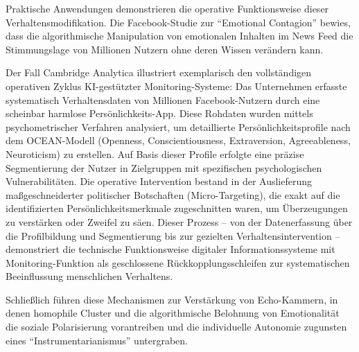 Praktische Anwendungen demonstrieren die operative Funktionsweise dieser Verhaltensmodifikation. Die Facebook-Studie zur \enquote{Emotional Contagion} bewies, dass die algorithmische Manipulation von emotionalen Inhalten im News Feed die Stimmungslage von Millionen Nutzern ohne deren Wissen verändern kann.

Der Fall Cambridge Analytica illustriert exemplarisch den vollständigen operativen Zyklus \ac{KI}-gestützter Monitoring-Systeme: Das Unternehmen erfasste systematisch Verhaltensdaten von Millionen Facebook-Nutzern durch eine scheinbar harmlose Persönlichkeits-App. Diese Rohdaten wurden mittels psychometrischer Verfahren analysiert, um detaillierte Persönlichkeitsprofile nach dem OCEAN-Modell (Openness, Conscientiousness, Extraversion, Agreeableness, Neuroticism) zu erstellen. Auf Basis dieser Profile erfolgte eine präzise Segmentierung der Nutzer in Zielgruppen mit spezifischen psychologischen Vulnerabilitäten. Die operative Intervention bestand in der Auslieferung maßgeschneiderter politischer Botschaften (Micro-Targeting), die exakt auf die identifizierten Persönlichkeitsmerkmale zugeschnitten waren, um Überzeugungen zu verstärken oder Zweifel zu säen. Dieser Prozess -- von der Datenerfassung über die Profilbildung und Segmentierung bis zur gezielten Verhaltensintervention -- demonstriert die technische Funktionsweise digitaler Informationssysteme mit Monitoring-Funktion als geschlossene Rückkopplungsschleifen zur systematischen Beeinflussung menschlichen Verhaltens.

Schließlich führen diese Mechanismen zur Verstärkung von Echo-Kammern, in denen homophile Cluster und die algorithmische Belohnung von Emotionalität die soziale Polarisierung vorantreiben und die individuelle Autonomie zugunsten eines \enquote{Instrumentarianismus} untergraben.

